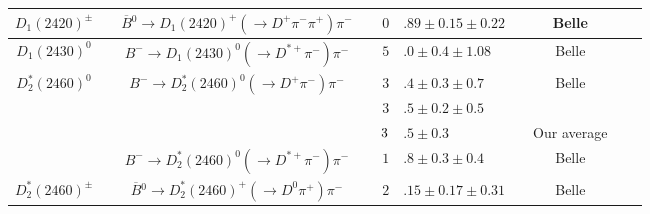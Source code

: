 \begin{adjustbox}{width=\textwidth,center}
{\begin{tabular}{cp{5pt}cp{5pt}r@{}lp{5pt}cp{5pt}c}
		\multirow{1}{*}{$D_{1}^{}(2420)^{\pm}$}      &   & \multirow{1}{*}{$\overline{B}{}^{0}\to D_{1}(2420)^{+}(\to D^{+}\pi^{-}\pi^{+})\pi^{-}$} & \cellcolor{LightGray} & \cellcolor{LightGray} $0$            & \cellcolor{LightGray}$.89\pm0.15\pm0.22$        & \cellcolor{LightGray} & \cellcolor{LightGray} Belle   & \cellcolor{LightGray} & \cite{Abe:2004sm}    \\ \midrule
		\multirow{1}{*}{$D_{1}(2430)^{0}$}           &   & $B^{-}\to D_{1}(2430)^{0}(\to D^{*+}\pi^{-})\pi^{-}$                                     & \cellcolor{LightGray} & \cellcolor{LightGray}$5$             & \cellcolor{LightGray}$.0\pm0.4\pm1.08$          & \cellcolor{LightGray} & \cellcolor{LightGray} Belle   & \cellcolor{LightGray} & \cite{Abe:2003zm}    \\ \midrule
		\multirow{4}{*}[-5pt]{$D_{2}^{*}(2460)^{0}$} &   & \multirow{3}{*}{$B^{-}\to D_{2}^{*}(2460)^{0}(\to D^{+}\pi^{-})\pi^{-}$}                 &                       & $3$                                  & $.4\pm0.3\pm0.7$                                &                       & Belle                         &                       & \cite{Abe:2003zm}    \\ 
		                                             &   &                                                                                          &                       & $3$                                  & $.5\pm0.2\pm0.5$                                &                       & \babar{}                      &                       & \cite{Aubert:2009wg} \\ \cmidrule{4-9}
		                                             &   &                                                                                          & \cellcolor{Gray}      & \cellcolor{Gray} $3\cellcolor{Gray}$ & \cellcolor{Gray}$.5 \pm 0.3$                    & \cellcolor{Gray}      & \cellcolor{Gray}  Our average & \cellcolor{Gray}      &                      \\ \cmidrule{3-9}
		                                             &   & \multirow{1}{*}{$B^{-}\to D_{2}^{*}(2460)^{0}(\to D^{*+}\pi^{-})\pi^{-}$}                & \cellcolor{LightGray} & \cellcolor{LightGray} $1$            & \cellcolor{LightGray}$.8\pm0.3\pm0.4$           & \cellcolor{LightGray} & \cellcolor{LightGray} Belle   & \cellcolor{LightGray} & \cite{Abe:2003zm}    \\ \midrule
		\multirow{1}{*}{$D_{2}^{*}(2460)^{\pm}$}     &   & \multirow{1}{*}{$\overline{B}{}^{0}\to D_{2}^{*}(2460)^{+}(\to D^{0}\pi^{+})\pi^{-}$}    & \cellcolor{LightGray} & \cellcolor{LightGray} $2$            & \cellcolor{LightGray}$.15\pm0.17\pm0.31$        & \cellcolor{LightGray} & \cellcolor{LightGray} Belle   & \cellcolor{LightGray} & \cite{Kuzmin:2006mw} \\	\bottomrule	
	\end{tabular}
}
\end{adjustbox}
